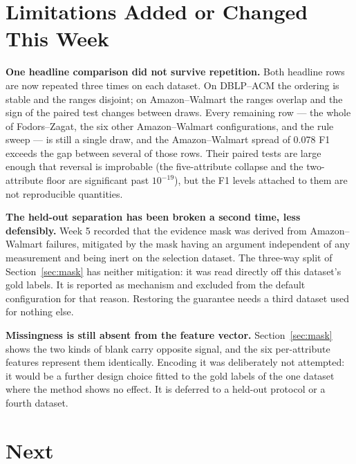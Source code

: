 \documentclass[11pt]{article}
\begin{document}
\section{Limitations Added or Changed This Week}

\textbf{One headline comparison did not survive repetition.} Both headline rows are now
repeated three times on each dataset. On DBLP--ACM the ordering is stable and the ranges
disjoint; on Amazon--Walmart the ranges overlap and the sign of the paired test changes
between draws. Every remaining row --- the whole of Fodors--Zagat, the six other
Amazon--Walmart configurations, and the rule sweep --- is still a single draw, and the
Amazon--Walmart spread of 0.078 F1 exceeds the gap between several of those rows. Their
paired tests are large enough that reversal is improbable (the five-attribute collapse and
the two-attribute floor are significant past $10^{-19}$), but the F1 levels attached to them
are not reproducible quantities.

\textbf{The held-out separation has been broken a second time, less defensibly.} Week 5
recorded that the evidence mask was derived from Amazon--Walmart failures, mitigated by the
mask having an argument independent of any measurement and being inert on the selection
dataset. The three-way split of Section~\ref{sec:mask} has neither mitigation: it was read
directly off this dataset's gold labels. It is reported as mechanism and excluded from the
default configuration for that reason. Restoring the guarantee needs a third dataset used for
nothing else.

\textbf{Missingness is still absent from the feature vector.} Section~\ref{sec:mask} shows
the two kinds of blank carry opposite signal, and the six per-attribute features represent
them identically. Encoding it was deliberately not attempted: it would be a further design
choice fitted to the gold labels of the one dataset where the method shows no effect. It is
deferred to a held-out protocol or a fourth dataset.

\section{Next}
\end{document}
